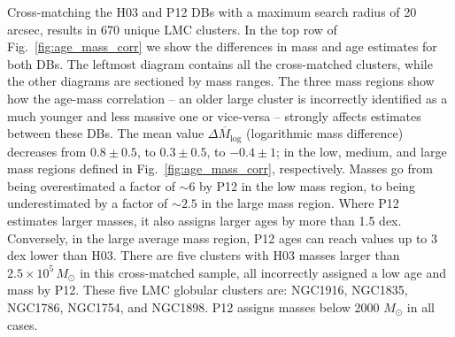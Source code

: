 \documentclass[draft]{aa}
\begin{document}
Cross-matching the H03 and P12 DBs with a maximum search radius of 20
arcsec, results in 670 unique LMC clusters.
In the top row of Fig.~\ref{fig:age_mass_corr} we show the differences
in mass and age estimates for both DBs. The leftmost diagram contains all the
cross-matched clusters, while the other diagrams are sectioned by mass
ranges. The three mass regions show how the age-mass correlation -- an older
large cluster is incorrectly identified as a much younger and less massive one
or vice-versa -- strongly affects estimates between these DBs.\@
%
The mean value $\overline{\Delta M_{\log}}$ (logarithmic mass difference)
decreases from $0.8{\pm}0.5$, to $0.3{\pm}0.5$, to $-0.4{\pm}1$; in the
low, medium, and large mass regions defined in
Fig.~\ref{fig:age_mass_corr}, respectively. Masses go from being overestimated a
factor of ${\sim}6$ by P12 in the low mass region, to being underestimated by a
factor of ${\sim}2.5$ in the large mass region.
%
Where P12 estimates larger masses, it also assigns larger ages by more than 1.5
dex. Conversely, in the large average mass region, P12 ages can reach
values up to 3 dex lower than H03.
%
There are five clusters with H03 masses larger than
$2.5{\times}10^5\,M_{\odot}$ in this cross-matched sample, all incorrectly
assigned a low age and mass by P12. These five LMC globular clusters
are: NGC1916, NGC1835, NGC1786, NGC1754, and NGC1898. P12 assigns masses below
2000 $M_{\odot}$ in all cases.
%
\end{document}

